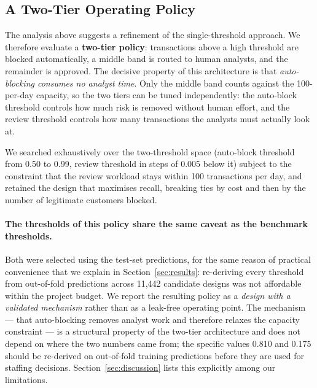 \subsection{A Two-Tier Operating Policy}
\label{sec:twotier}

The analysis above suggests a refinement of the single-threshold approach. We
therefore evaluate a \textbf{two-tier policy}: transactions above a high
threshold are blocked automatically, a middle band is routed to human analysts,
and the remainder is approved. The decisive property of this architecture is
that \emph{auto-blocking consumes no analyst time}. Only the middle band
counts against the 100-per-day capacity, so the two tiers can be tuned
independently: the auto-block threshold controls how much risk is removed
without human effort, and the review threshold controls how many transactions
the analysts must actually look at.

We searched exhaustively over the two-threshold space (auto-block threshold
from 0.50 to 0.99, review threshold in steps of 0.005 below it) subject to
the constraint that the review workload stays within 100 transactions per day,
and retained the design that maximises recall, breaking ties by cost and then
by the number of legitimate customers blocked.

\paragraph{The thresholds of this policy share the same caveat as the
benchmark thresholds.} Both were selected using the test-set predictions, for
the same reason of practical convenience that we explain in
Section~\ref{sec:results}: re-deriving every threshold from out-of-fold
predictions across 11{,}442 candidate designs was not affordable within the
project budget. We report the resulting policy as a \emph{design with a
validated mechanism} rather than as a leak-free operating point. The
mechanism --- that auto-blocking removes analyst work and therefore relaxes
the capacity constraint --- is a structural property of the two-tier
architecture and does not depend on where the two numbers came from; the
specific values 0.810 and 0.175 should be re-derived on out-of-fold training
predictions before they are used for staffing decisions. Section~\ref{sec:discussion}
lists this explicitly among our limitations.

